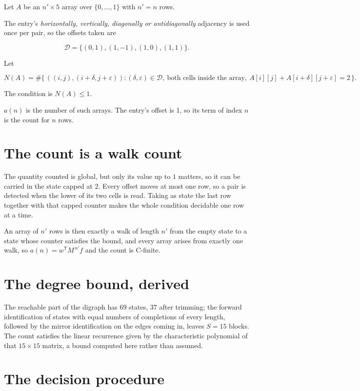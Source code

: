 \documentclass[11pt]{article}
\theoremstyle{definition}
\begin{document}
Let $A$ be an $n' \times 5$ array over $\{0,\dots,1\}$ with $n' = n$ rows.

The entry's {\itshape horizontally, vertically, diagonally or antidiagonally} adjacency is used once per pair, so the offsets taken are

\[\mathcal{D} = \{(0,1), (1,-1), (1,0), (1,1)\}.\]

Let

\[N(A) = \#\bigl\{\,((i,j),(i{+}\delta,j{+}\varepsilon)) : (\delta,\varepsilon) \in \mathcal{D},\ \text{both cells inside the array},\ A[i][j] + A[i{+}\delta][j{+}\varepsilon] = 2\,\bigr\}.\]

The condition is $N(A) \le 1$.

$a(n)$ is the number of such arrays. The entry's offset is 1, so its term of index $n$ is the count for $n$ rows.

\section{The count is a walk count}

The quantity counted is global, but only its value up to $1$ matters, so it can be carried in the state capped at $2$. Every offset moves at most one row, so a pair is detected when the lower of its two cells is read. Taking as state the last row together with that capped counter makes the whole condition decidable one row at a time.

An array of $n'$ rows is then exactly a walk of length $n'$ from the empty state to a state whose counter satisfies the bound, and every array arises from exactly one walk, so $a(n) = w^{\mathsf T}M^{\,n'}f$ and the count is C-finite.

\section{The degree bound, derived}

The reachable part of the digraph has $69$ states, $37$ after trimming; the forward identification of states with equal numbers of completions of every length, followed by the mirror identification on the edges coming in, leaves $S = 15$ blocks. The count satisfies the linear recurrence given by the characteristic polynomial of that $15\times15$ matrix, a bound computed here rather than assumed.

\section{The decision procedure}
\end{document}
